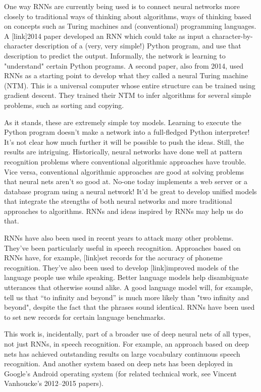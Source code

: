 \documentclass[a4paper,twoside,10pt]{book}
\begin{document}
One way RNNs are currently being used is to connect neural networks more closely to traditional ways of thinking about algorithms, ways of thinking based on concepts such as Turing machines and (conventional) programming languages. A [link]2014 paper developed an RNN which could take as input a character-by-character description of a (very, very simple!) Python program, and use that description to predict the output. Informally, the network is learning to "understand" certain Python programs. A second paper, also from 2014, used RNNs as a starting point to develop what they called a neural Turing machine (NTM). This is a universal computer whose entire structure can be trained using gradient descent. They trained their NTM to infer algorithms for several simple problems, such as sorting and copying.

As it stands, these are extremely simple toy models. Learning to execute the Python program  doesn't make a network into a full-fledged Python interpreter! It's not clear how much further it will be possible to push the ideas. Still, the results are intriguing. Historically, neural networks have done well at pattern recognition problems where conventional algorithmic approaches have trouble. Vice versa, conventional algorithmic approaches are good at solving problems that neural nets aren't so good at. No-one today implements a web server or a database program using a neural network! It'd be great to develop unified models that integrate the strengths of both neural networks and more traditional approaches to algorithms. RNNs and ideas inspired by RNNs may help us do that.

RNNs have also been used in recent years to attack many other problems. They've been particularly useful in speech recognition. Approaches based on RNNs have, for example, [link]set records for the accuracy of phoneme recognition. They've also been used to develop [link]improved models of the language people use while speaking. Better language models help disambiguate utterances that otherwise sound alike. A good language model will, for example, tell us that ``to infinity and beyond'' is much more likely than "two infinity and beyond", despite the fact that the phrases sound identical. RNNs have been used to set new records for certain language benchmarks.

This work is, incidentally, part of a broader use of deep neural nets of all types, not just RNNs, in speech recognition. For example, an approach based on deep nets has achieved outstanding results on large vocabulary continuous speech recognition. And another system based on deep nets has been deployed in Google's Android operating system (for related technical work, see Vincent Vanhoucke's 2012--2015 papers).
\end{document}
